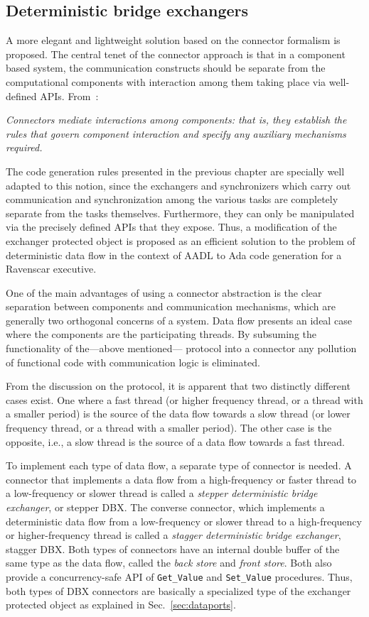 \subsection{Deterministic bridge exchangers}
\label{sec:DBX}
A more elegant and lightweight solution based on the connector
formalism is proposed. The central tenet of the connector approach is
that in a component based system, the communication constructs should
be separate from the computational components with interaction among
them taking place via well-defined APIs. From~\cite{mehta@icse00}:

\emph{Connectors mediate interactions among components: that is, they
  establish the rules that govern component interaction and specify
  any auxiliary mechanisms required.}

The code generation rules presented in the previous chapter are
specially well adapted to this notion, since the exchangers and
synchronizers which carry out communication and synchronization among
the various tasks are completely separate from the tasks
themselves. Furthermore, they can only be manipulated via the
precisely defined APIs that they expose. Thus, a modification of the
exchanger protected object is proposed as an efficient solution to the
problem of deterministic data flow in the context of AADL to Ada code
generation for a Ravenscar executive.

One of the main advantages of using a connector abstraction is the
clear separation between components and communication mechanisms,
which are generally two orthogonal concerns of a system. Data flow
presents an ideal case where the components are the participating
threads. By subsuming the functionality of the---above mentioned---
protocol into a connector any pollution of functional code with
communication logic is eliminated.

From the discussion on the protocol, it is apparent that two
distinctly different cases exist. One where a fast thread (or higher
frequency thread, or a thread with a smaller period) is the source of
the data flow towards a slow thread (or lower frequency thread, or a
thread with a smaller period). The other case is the opposite, i.e., a
slow thread is the source of a data flow towards a fast thread.

To implement each type of data flow, a separate type of connector is
needed. A connector that implements a data flow from a high-frequency
or faster thread to a low-frequency or slower thread is called a
\emph{stepper deterministic bridge exchanger}, or stepper DBX. The
converse connector, which implements a deterministic data flow from a
low-frequency or slower thread to a high-frequency or higher-frequency
thread is called a \emph{stagger deterministic bridge exchanger},
stagger DBX. Both types of connectors have an internal double buffer
of the same type as the data flow, called the \emph{back store} and
\emph{front store}. Both also provide a concurrency-safe API of
\texttt{Get\_Value} and \texttt{Set\_Value} procedures. Thus, both
types of DBX connectors are basically a specialized type of the
exchanger protected object as explained in Sec.~\ref{sec:dataports}.

